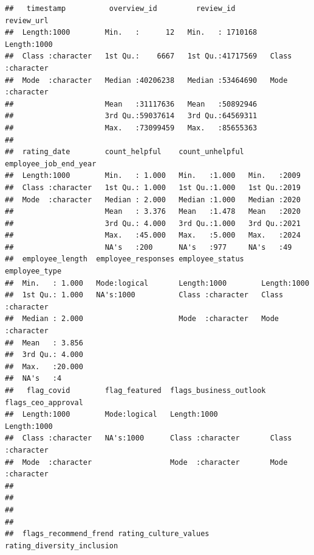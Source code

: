\documentclass[
]{article}
\begin{document}
\begin{verbatim}
##   timestamp          overview_id         review_id         review_url       
##  Length:1000        Min.   :      12   Min.   : 1710168   Length:1000       
##  Class :character   1st Qu.:    6667   1st Qu.:41717569   Class :character  
##  Mode  :character   Median :40206238   Median :53464690   Mode  :character  
##                     Mean   :31117636   Mean   :50892946                     
##                     3rd Qu.:59037614   3rd Qu.:64569311                     
##                     Max.   :73099459   Max.   :85655363                     
##                                                                             
##  rating_date        count_helpful    count_unhelpful employee_job_end_year
##  Length:1000        Min.   : 1.000   Min.   :1.000   Min.   :2009         
##  Class :character   1st Qu.: 1.000   1st Qu.:1.000   1st Qu.:2019         
##  Mode  :character   Median : 2.000   Median :1.000   Median :2020         
##                     Mean   : 3.376   Mean   :1.478   Mean   :2020         
##                     3rd Qu.: 4.000   3rd Qu.:1.000   3rd Qu.:2021         
##                     Max.   :45.000   Max.   :5.000   Max.   :2024         
##                     NA's   :200      NA's   :977     NA's   :49           
##  employee_length  employee_responses employee_status    employee_type     
##  Min.   : 1.000   Mode:logical       Length:1000        Length:1000       
##  1st Qu.: 1.000   NA's:1000          Class :character   Class :character  
##  Median : 2.000                      Mode  :character   Mode  :character  
##  Mean   : 3.856                                                           
##  3rd Qu.: 4.000                                                           
##  Max.   :20.000                                                           
##  NA's   :4                                                                
##   flag_covid        flag_featured  flags_business_outlook flags_ceo_approval
##  Length:1000        Mode:logical   Length:1000            Length:1000       
##  Class :character   NA's:1000      Class :character       Class :character  
##  Mode  :character                  Mode  :character       Mode  :character  
##                                                                             
##                                                                             
##                                                                             
##                                                                             
##  flags_recommend_frend rating_culture_values rating_diversity_inclusion

\end{verbatim}
\end{document}
